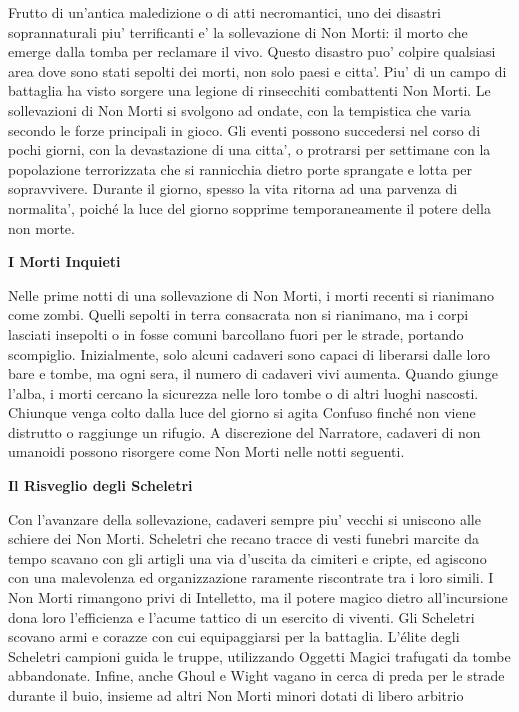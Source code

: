 \documentclass[a4paper,11pt,twoside,openany]{book}
\begin{document}
Frutto di un'antica maledizione o di atti necromantici, uno dei disastri soprannaturali piu' terrificanti e' la sollevazione di Non Morti: il morto che emerge dal­la tomba per reclamare il vivo. Questo disastro puo' colpire qualsiasi area dove sono stati sepolti dei morti, non solo paesi e citta'. Piu' di un campo di battaglia ha visto sorgere una legione di rinsecchiti combattenti Non Morti. Le sollevazioni di Non Morti si svolgono ad ondate, con la tempistica che varia secondo le forze principali in gioco. Gli eventi possono succedersi nel corso di pochi giorni, con la devastazione di una citta', o protrarsi per settimane con la popolazione terrorizzata che si rannicchia dietro porte sprangate e lotta per sopravvivere. Durante il giorno, spesso la vita ritorna ad una parvenza di normalita', poiché la luce del giorno sopprime temporaneamente il potere della non morte.

\textbf{I Morti Inquieti}

Nelle prime notti di una sollevazione di Non Morti, i morti recenti si rianimano come zombi. Quelli sepolti in terra consacrata non si rianimano, ma i corpi lasciati insepolti o in fosse comuni barcollano fuori per le strade, portando scompiglio. Inizialmente, solo alcuni cadaveri sono capaci di liberarsi dal­le loro bare e tombe, ma ogni sera, il numero di cadaveri vivi aumenta. Quando giunge l'alba, i morti cercano la sicurezza nelle loro tombe o di altri luoghi nascosti. Chiunque venga colto dalla luce del giorno si agita Confuso finché non viene distrutto o raggiunge un rifugio. A discrezione del Narratore, cadaveri di non umanoidi possono risorgere come Non Morti nelle notti seguenti.

\textbf{Il Risveglio degli Scheletri}

Con l'avanzare della sollevazione, cadaveri sempre piu' vecchi si uniscono alle schiere dei Non Morti. Scheletri che recano tracce di vesti funebri marcite da tempo scavano con gli artigli una via d'uscita da cimiteri e cripte, ed agiscono con una malevolenza ed organizzazione raramente riscontrate tra i loro simili. I Non Morti rimangono privi di Intelletto, ma il potere magico dietro all'incursione dona loro l'efficienza e l'acume tattico di un esercito di viventi. Gli Scheletri scovano armi e corazze con cui equipaggiarsi per la battaglia. L'élite degli Scheletri campioni guida le truppe, utilizzando Oggetti Magici trafugati da tombe abbandonate. Infine, anche Ghoul e Wight vagano in cerca di preda per le strade durante il buio, insieme ad altri Non Morti minori dotati di libero arbitrio
\end{document}
